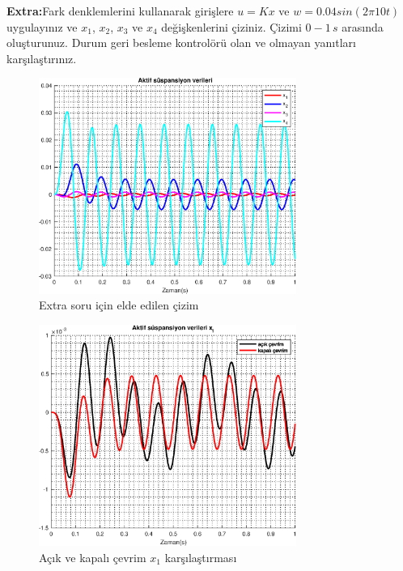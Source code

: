 \noindent\textbf{Extra:}Fark denklemlerini kullanarak girişlere $u=Kx$ ve $w=0.04sin(2\pi10t)$ uygulayınız ve $x_1$, $x_2$, $x_3$ ve $x_4$ değişkenlerini çiziniz. Çizimi $0-1\,s$ arasında oluşturunuz. Durum geri besleme kontrolörü olan ve olmayan yanıtları karşılaştırınız.

\begin{figure}[!htb]
    \centering
    \includegraphics[width=0.75\textwidth]{plot1}
    \caption{Extra soru için elde edilen çizim}
    \label{fig:plot1}
\end{figure}

\begin{figure}[!htb]
    \centering
    \includegraphics[width=0.75\textwidth]{plot2}
    \caption{Açık ve kapalı çevrim $x_1$ karşılaştırması}
\end{figure}

